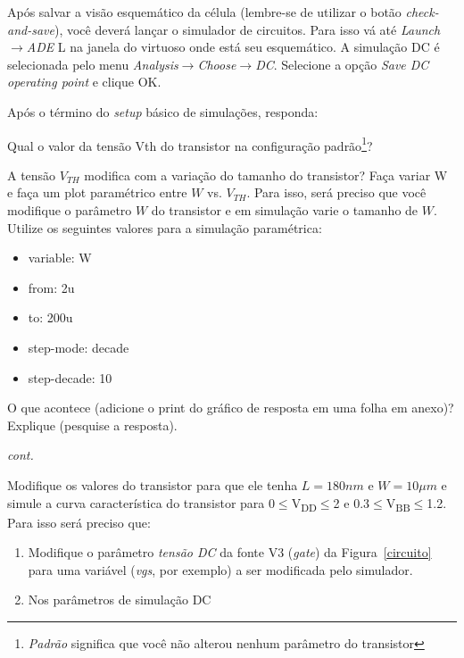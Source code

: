 Após salvar a visão esquemático da célula (lembre-se de utilizar o botão {\em check-and-save}), você deverá lançar o simulador de circuitos. Para isso vá até {\em Launch$\rightarrow$ADE} L na janela do virtuoso onde está seu esquemático. A simulação DC é selecionada pelo menu {\em Analysis$\rightarrow$Choose$\rightarrow$DC}. Selecione a opção {\em Save DC operating point} e clique OK.

\noindent Após o término do {\em setup} básico de simulações, responda:

\begin{questions}
\question Qual o valor da tensão Vth do transistor na configuração padrão\footnote{{\em Padrão} significa que você não alterou nenhum parâmetro do transistor}? 
\begin{EnvFullwidth}
\makeemptybox{1in}
\end{EnvFullwidth}
\question A tensão $V_{TH}$ modifica com a variação do tamanho do transistor? Faça variar W e faça um plot paramétrico entre $W$ vs. $V_{TH}$. Para isso, será preciso que você modifique o parâmetro $W$ do transistor e em simulação varie o tamanho de $W$. Utilize os seguintes valores para a simulação paramétrica:
\begin{itemize}
    \item variable: W
    \item from: 2u
    \item to: 200u
    \item step-mode: decade
    \item step-decade: 10
\end{itemize}
 O que acontece (adicione o print do gráfico de resposta em uma folha em anexo)? Explique (pesquise a resposta).
\begin{EnvFullwidth}
\makeemptybox{2in}
\end{EnvFullwidth}
\newpage
{\em cont.}
\begin{EnvFullwidth}
\makeemptybox{4in}
\end{EnvFullwidth}
\question Modifique os valores do transistor para que ele tenha $L=180nm$ e $W=10\mu m$ e simule a curva característica do transistor para 0$\leq$V\textsubscript{DD}$\leq$2 e 0.3$\leq$V\textsubscript{BB}$\leq$1.2. 
Para isso será preciso que:
\begin{enumerate}
    \item Modifique o parâmetro {\em tensão DC} da fonte V3 ({\em gate}) da Figura~\ref{circuito} para uma variável ({\em vgs}, por exemplo) a ser modificada pelo simulador.
    \item Nos parâmetros de simulação DC 

\end{enumerate}
\end{questions}
